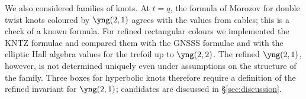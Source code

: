 We also considered families of knots.
At $t=q$, the formula of Morozov \cite{Morozov16,Morozov19} for double twist knots coloured by $\yng(2,1)$ agrees with the values from cables; this is a check of a known formula.
For refined rectangular colours we implemented the KNTZ formulae and compared them with the GNSSS formulae and with the elliptic Hall algebra values for the trefoil up to $\yng(2,2)$.
The refined $\yng(2,1)$, however, is not determined uniquely even under assumptions on the structure of the family.
Three boxes for hyperbolic knots therefore require a definition of the refined invariant for $\yng(2,1)$; candidates are discussed in \S\ref{sec:discussion}.
